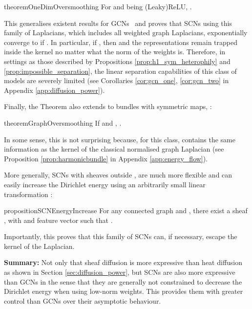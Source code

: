 \documentclass{article}
\begin{document}
\begin{restatable}{theorem}{OneDimOversmoothing}\label{theo:1dim_oversmoothing}
For  and  being (Leaky)ReLU, .
\end{restatable}

This generalises existent results for GCNs~\citep{cai2020note, oono2019graph} and proves that SCNs using this family of Laplacians, which includes all weighted graph Laplacians, exponentially converge to  if . In particular, if , then  and the representations remain trapped inside the kernel no matter what the norm of the weights is. Therefore, in settings as those described by Propositions \ref{prop:h1_sym_heterophily} and \ref{prop:impossible_separation}, the linear separation capabilities of this class of models are severely limited (see Corollaries \ref{cor:gcn_one}, \ref{cor:gcn_two} in Appendix \ref{app:diffusion_power}). 

Finally, the Theorem also extends to bundles with symmetric maps, :
\begin{restatable}{theorem}{GraphOversmoothing}\label{theo:graph_oversmoothing}
If  and , . 
\end{restatable}
In some sense, this is not surprising because, for this class,  contains the same information as the kernel of the classical normalised graph Laplacian (see Proposition \ref{prop:harmonicbundle} in Appendix \ref{app:energy_flow}). 

More generally, SCNs with sheaves outside , are much more flexible and can easily increase the Dirichlet energy using an arbitrarily small linear transformation :
\begin{restatable}{proposition}{SCNEnergyIncrease}\label{prop:scn_energy_increase}
For any connected graph  and , there exist a sheaf  ,  with  and feature vector  such that .
\end{restatable}
Importantly, this proves that this family of SCNs can, if necessary, escape the kernel of the Laplacian.

\begin{tcolorbox}[boxsep=0mm,left=2.5mm,right=2.5mm]
\textbf{Summary:} Not only that sheaf diffusion is more expressive than heat diffusion as shown in Section \ref{sec:diffusion_power}, but SCNs are also more expressive than GCNs in the sense that they are generally not constrained to decrease the Dirichlet energy when using low-norm weights. This provides them with greater control than GCNs over their asymptotic behaviour.  
\end{tcolorbox}
\vspace{-5pt}
\end{document}
